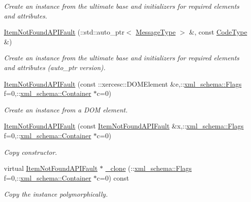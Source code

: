 \begin{DoxyCompactItemize}
\begin{DoxyCompactList}\small\item\em Create an instance from the ultimate base and initializers for required elements and attributes. \item\end{DoxyCompactList}\item 
\hyperlink{classopenstack_1_1xml_1_1ItemNotFoundAPIFault_ac4debcb59151f6f08a74b1776e376d8a}{ItemNotFoundAPIFault} (::std::auto\_\-ptr$<$ \hyperlink{classopenstack_1_1xml_1_1CloudServersAPIFault_aff7b9d2067747fa033a0ea4408011af6}{MessageType} $>$ \&, const \hyperlink{classopenstack_1_1xml_1_1CloudServersAPIFault_aa9f350c9dba08ae375b2a61568551550}{CodeType} \&)
\begin{DoxyCompactList}\small\item\em Create an instance from the ultimate base and initializers for required elements and attributes (auto\_\-ptr version). \item\end{DoxyCompactList}\item 
\hyperlink{classopenstack_1_1xml_1_1ItemNotFoundAPIFault_ae2e500c89f0a08f7ccf85e5ba9b0c358}{ItemNotFoundAPIFault} (const ::xercesc::DOMElement \&e,::\hyperlink{namespacexml__schema_affb4c227cbd9aa7453dd1dc5a1401943}{xml\_\-schema::Flags} f=0,::\hyperlink{namespacexml__schema_a333dea2213742aea47a37532dec4ec27}{xml\_\-schema::Container} $\ast$c=0)
\begin{DoxyCompactList}\small\item\em Create an instance from a DOM element. \item\end{DoxyCompactList}\item 
\hyperlink{classopenstack_1_1xml_1_1ItemNotFoundAPIFault_ab484e9ca4933ba6285c6d706de911eb8}{ItemNotFoundAPIFault} (const \hyperlink{classopenstack_1_1xml_1_1ItemNotFoundAPIFault}{ItemNotFoundAPIFault} \&x,::\hyperlink{namespacexml__schema_affb4c227cbd9aa7453dd1dc5a1401943}{xml\_\-schema::Flags} f=0,::\hyperlink{namespacexml__schema_a333dea2213742aea47a37532dec4ec27}{xml\_\-schema::Container} $\ast$c=0)
\begin{DoxyCompactList}\small\item\em Copy constructor. \item\end{DoxyCompactList}\item 
virtual \hyperlink{classopenstack_1_1xml_1_1ItemNotFoundAPIFault}{ItemNotFoundAPIFault} $\ast$ \hyperlink{classopenstack_1_1xml_1_1ItemNotFoundAPIFault_a5a42e3c91a8832184bc37f6cc1b53d41}{\_\-clone} (::\hyperlink{namespacexml__schema_affb4c227cbd9aa7453dd1dc5a1401943}{xml\_\-schema::Flags} f=0,::\hyperlink{namespacexml__schema_a333dea2213742aea47a37532dec4ec27}{xml\_\-schema::Container} $\ast$c=0) const 
\begin{DoxyCompactList}\small\item\em Copy the instance polymorphically. \item\end{DoxyCompactList}\end{DoxyCompactItemize}


